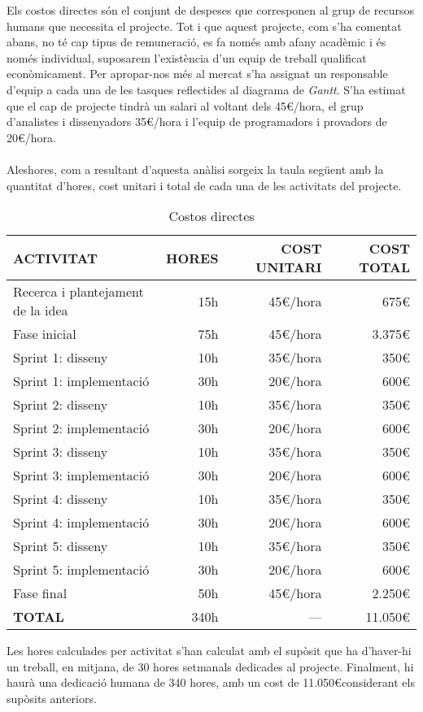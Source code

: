Els costos directes són el conjunt de despeses que corresponen al grup de recursos humans que necessita el projecte. Tot i que aquest projecte, com s'ha comentat abans, no té cap tipus de remuneració, es fa només amb afany acadèmic i és només individual, suposarem l'existència d'un equip de treball qualificat econòmicament. Per apropar-nos més al mercat s'ha assignat un responsable d'equip a cada una de les tasques reflectides al diagrama de \textit{Gantt}. S'ha estimat que el cap de projecte tindrà un salari al voltant dels 45\euro/hora, el grup d'analistes i dissenyadors 35\euro/hora i l'equip de programadors i provadors de 20\euro/hora.
\\\\
Aleshores, com a resultant d'aquesta anàlisi sorgeix la taula següent amb la quantitat d'hores, cost unitari i total de cada una de les activitats del projecte.
\\
\begin{table}[H]
\centering
\begin{tabular}{ | l | r | r | r |}
\hline
\textbf{ACTIVITAT}&\textbf{HORES}&\textbf{COST UNITARI}&\textbf{COST TOTAL} \\ \hline
Recerca i plantejament de la idea & 15h & 45\euro/hora & 675\euro \\ \hline
Fase inicial & 75h & 45\euro/hora & 3.375\euro \\ \hline
Sprint 1: disseny & 10h & 35\euro/hora & 350\euro \\ \hline
Sprint 1: implementació & 30h & 20\euro/hora & 600\euro \\ \hline
Sprint 2: disseny & 10h & 35\euro/hora & 350\euro \\ \hline
Sprint 2: implementació & 30h & 20\euro/hora & 600\euro \\ \hline
Sprint 3: disseny & 10h & 35\euro/hora & 350\euro \\ \hline
Sprint 3: implementació & 30h & 20\euro/hora & 600\euro \\ \hline
Sprint 4: disseny & 10h & 35\euro/hora & 350\euro \\ \hline
Sprint 4: implementació & 30h & 20\euro/hora & 600\euro \\ \hline
Sprint 5: disseny & 10h & 35\euro/hora & 350\euro \\ \hline
Sprint 5: implementació & 30h & 20\euro/hora & 600\euro \\ \hline
Fase final & 50h & 45\euro/hora & 2.250\euro \\ \hline
\textbf{TOTAL} & 340h & --- & 11.050\euro \\
\hline
\end{tabular}
\caption{Costos directes}
\end{table}
\noindent Les hores calculades per activitat s'han calculat amb el supòsit que ha d'haver-hi un treball, en mitjana, de 30 hores setmanals dedicades al projecte. Finalment, hi haurà una dedicació humana de 340 hores, amb un cost de 11.050\euro\space considerant els supòsits anteriors.

